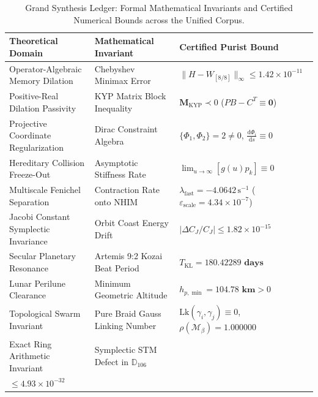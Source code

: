 \documentclass[11pt,a4paper,reqno]{article}
\theoremstyle{plain}
\theoremstyle{definition}
\theoremstyle{remark}
\numberwithin{equation}{section}
\newcommand{\Ddd}{\mathbb{D}_{106}}
\begin{document}
\begin{table}[htbp]
\centering
\small
\caption{Grand Synthesis Ledger: Formal Mathematical Invariants and Certified Numerical Bounds across the Unified Corpus.}
\label{tab:purist_synthesis_ledger}
\vspace{0.4em}
\begin{tabular}{>{\raggedright\arraybackslash}p{5.1cm}
                >{\raggedright\arraybackslash}p{4.4cm}
                >{\raggedright\arraybackslash}p{5.4cm}}
\toprule
\textbf{Theoretical Domain} & \textbf{Mathematical Invariant} & \textbf{Certified Purist Bound} \\
\midrule
Operator-Algebraic Memory Dilation & Chebyshev Minimax Error & $\|H - W_{[8/8]}\|_\infty \le 1.42 \times 10^{-11}$ \\
Positive-Real Dilation Passivity & KYP Matrix Block Inequality & $\mathbf{M}_{\mathrm{KYP}} \prec 0$ ($P B - C^T \equiv \mathbf{0}$) \\
Projective Coordinate Regularization & Dirac Constraint Algebra & $\{\Phi_1, \Phi_2\} = 2 \ne 0$, $\frac{\mathrm{d}\Phi_i}{\mathrm{d}s} \equiv 0$ \\
Hereditary Collision Freeze-Out & Asymptotic Stiffness Rate & $\lim_{u \to \infty} [g(u) p_k] \equiv 0$ \\
Multiscale Fenichel Separation & Contraction Rate onto NHIM & $\lambda_{\mathrm{fast}} = -4.0642\,\mathrm{s}^{-1}$ ($\varepsilon_{\mathrm{scale}} = 4.34 \times 10^{-7}$) \\
Jacobi Constant Symplectic Invariance & Orbit Coast Energy Drift & $|\Delta C_J / C_J| \le 1.82 \times 10^{-15}$ \\
Secular Planetary Resonance & Artemis 9:2 Kozai Beat Period & $T_{\mathrm{KL}} = \mathbf{180.42289\text{ days}}$ \\
Lunar Perilune Clearance & Minimum Geometric Altitude & $h_{p,\min} = \mathbf{104.78\text{ km}} > 0$ \\
Topological Swarm Invariant & Pure Braid Gauss Linking Number & $\mathrm{Lk}(\gamma_i, \gamma_j) \equiv 0$, $\rho(\mathcal{M}_\beta) = 1.000000$ \\
Exact Ring Arithmetic Invariant & Symplectic STM Defect in $\Ddd$ & \shortstack[l]{$\|\mathbf{\Phi}_{\mathrm{STM}}^T \mathbf{J} \mathbf{\Phi}_{\mathrm{STM}} - \mathbf{J}\|_\infty$\\$\le 4.93 \times 10^{-32}$} \\
\bottomrule
\end{tabular}
\end{table}
\end{document}
